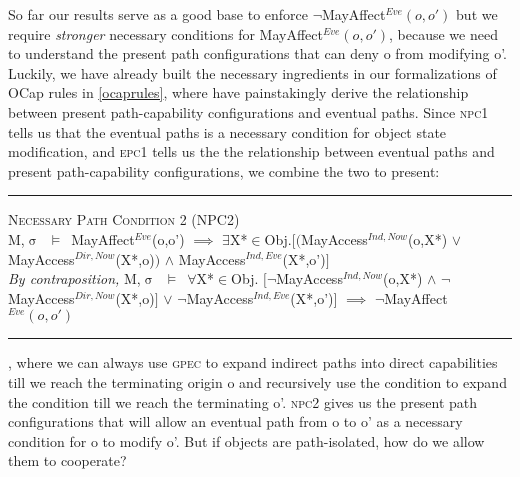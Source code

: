 \documentclass[a4paper,11pt, twoside,twocolumn]{article}
\newenvironment{logic}[1][]
{\begin{flushleft} \small }
{\end{flushleft}}
\newcommand{\loin}{$\in$}
\newcommand{\loforall}{$\forall$}
\newcommand{\loexists}{$\exists$}
\newcommand{\loand}{$\land$}
\newcommand{\loor} {$\lor$}
\newcommand{\loimplies}{$\implies$}
\newcommand{\losigma}{$\upsigma$}
\newcommand{\loturns} {$\vDash$}
\newcommand{\loneg}{$\boldsymbol \neg$}
\newcommand{\ablock} {\null\qquad}
\begin{document}
So far our results serve as a good base to enforce \loneg MayAffect$^{Eve}(o,o')$ but we require \textit{stronger} necessary conditions for MayAffect$^{Eve}(o,o')$, because we need to understand the present path configurations that can deny o from modifying o'. Luckily, we have already built the necessary ingredients in our formalizations of OCap rules in \ref{ocaprules}, where have painstakingly derive the relationship between present path-capability configurations and eventual paths. Since \textsc{npc1} tells us that the eventual paths is a necessary condition for object state modification, and \textsc{epc1} tells us the the relationship between eventual paths and present path-capability configurations, we combine the two to present: 

\begin{logic}
\hrule\null
\textsc{\normalsize *Necessary Path Condition 2 (NPC2)}\\
M,\losigma\ \loturns\ MayAffect$^{Eve}$(o,o')\linebreak
\ablock \loimplies\linebreak
\ablock \loexists X*\loin Obj.$[($MayAccess$^{Ind,Now}$(o,X*) \loor \linebreak
\ablock \ablock \ablock \quad MayAccess$^{Dir,Now}$(X*,o)$)$\linebreak
\ablock \ablock \ablock \ablock \loand \linebreak
\ablock \ablock \ablock \quad MayAccess$^{Ind,Eve}$(X*,o')$]$
\linebreak \\
\textit{By contraposition,}\linebreak
M,\losigma\ \loturns\ 
\loforall X*\loin Obj. $[$\loneg MayAccess$^{Ind,Now}$(o,X*) \loand \linebreak
\ablock \ablock \ablock \ablock \loneg MayAccess$^{Dir,Now}$(X*,o)$]$\linebreak
\ablock \ablock \ablock \ablock \loor \linebreak
\ablock \ablock \ablock \ablock \loneg MayAccess$^{Ind,Eve}$(X*,o')$]$\linebreak
\ablock \loimplies \linebreak
	\ablock\loneg MayAffect$^{Eve}(o,o')$\linebreak
\hrule
\end{logic}
, where we can always use \textsc{gpec} to expand indirect paths into direct capabilities till we reach the terminating origin o and recursively use the condition to expand the condition till we reach the terminating o'. \textsc{npc2} gives us the present path configurations that will allow an eventual path from o to o' as a necessary condition for o to modify o'. But if objects are path-isolated, how do we allow them to cooperate? 
\end{document}
